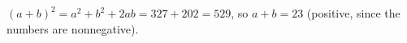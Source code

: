 $(a+b)^2=a^2+b^2+2ab=327+202=529$, so $a+b=\boxed{23}$ (positive, since the numbers are nonnegative).
